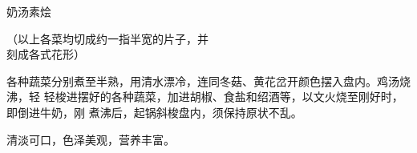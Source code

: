 %
%
%
%
%
%
%
\begin{recipe}{奶汤素烩}

\ingredients

{\kafamily\null\hspace{4em}（以上各菜均切成约一指半宽的片子，并\\
 \null\hspace{5em}刻成各式花形）\\}

\preparation

各种蔬菜分别煮至半熟，用清水漂冷，连同冬菇、黄花岔开颜色摆入盘内。鸡汤烧沸，轻
轻梭进摆好的各种蔬菜，加进胡椒、食盐和绍酒等，以文火烧至刚好时，即倒进牛奶，刚
煮沸后，起锅斜梭盘内，须保持原状不乱。

\features

清淡可口，色泽美观，营养丰富。

\end{recipe}

